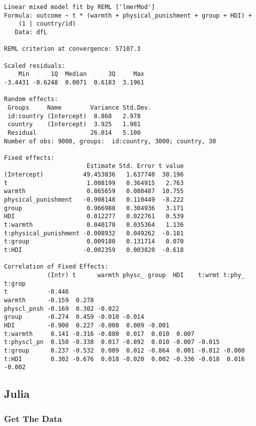 \documentclass[
  letterpaper,
  DIV=11,
  numbers=noendperiod]{scrreprt}
\begin{document}
\begin{verbatim}
Linear mixed model fit by REML ['lmerMod']
Formula: outcome ~ t * (warmth + physical_punishment + group + HDI) +  
    (1 | country/id)
   Data: dfL

REML criterion at convergence: 57107.3

Scaled residuals: 
    Min      1Q  Median      3Q     Max 
-3.4431 -0.6248  0.0071  0.6183  3.1961 

Random effects:
 Groups     Name        Variance Std.Dev.
 id:country (Intercept)  8.868   2.978   
 country    (Intercept)  3.925   1.981   
 Residual               26.014   5.100   
Number of obs: 9000, groups:  id:country, 3000; country, 30

Fixed effects:
                       Estimate Std. Error t value
(Intercept)           49.453036   1.637740  30.196
t                      1.008199   0.364915   2.763
warmth                 0.865659   0.080487  10.755
physical_punishment   -0.908148   0.110449  -8.222
group                  0.966988   0.304936   3.171
HDI                    0.012277   0.022761   0.539
t:warmth               0.040170   0.035364   1.136
t:physical_punishment -0.008932   0.049262  -0.181
t:group                0.009180   0.131714   0.070
t:HDI                 -0.002359   0.003820  -0.618

Correlation of Fixed Effects:
            (Intr) t      warmth physc_ group  HDI    t:wrmt t:phy_ t:grop
t           -0.446                                                        
warmth      -0.159  0.278                                                 
physcl_pnsh -0.169  0.302 -0.022                                          
group       -0.274  0.459 -0.010 -0.014                                   
HDI         -0.900  0.227 -0.008  0.009 -0.001                            
t:warmth     0.141 -0.316 -0.880  0.017  0.010  0.007                     
t:physcl_pn  0.150 -0.338  0.017 -0.892  0.010 -0.007 -0.015              
t:group      0.237 -0.532  0.009  0.012 -0.864  0.001 -0.012 -0.008       
t:HDI        0.302 -0.676  0.018 -0.020  0.002 -0.336 -0.018  0.016 -0.002
\end{verbatim}

\subsection{Julia}

\subsubsection{Get The Data}\label{get-the-data-5}
\end{document}
